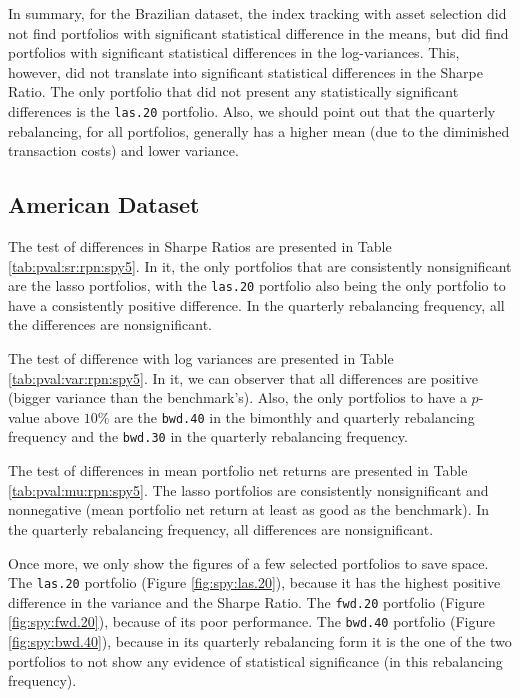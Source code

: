 \documentclass[12pt,oneside,a4paper]{memoir}
\begin{document}
In summary, for the Brazilian dataset, the index tracking with asset selection did not find portfolios with significant statistical difference in the means, but did find portfolios with significant statistical differences in the log-variances.
This, however, did not translate into significant statistical differences in the Sharpe Ratio.
The only portfolio that did not present any statistically significant differences is the \texttt{las.20} portfolio.
Also, we should point out that the quarterly rebalancing, for all portfolios, generally has a higher mean (due to the diminished transaction costs) and lower variance. 

\subsection{American Dataset} 

The test of differences in Sharpe Ratios are presented in Table \ref{tab:pval:sr:rpn:spy5}.
In it, the only portfolios that are consistently nonsignificant are the lasso portfolios, with the \texttt{las.20} portfolio also being the only portfolio to have a consistently positive difference.
In the quarterly rebalancing frequency, all the differences are nonsignificant.

The test of difference with log variances are presented in Table \ref{tab:pval:var:rpn:spy5}.
In it, we can observer that all differences are positive (bigger variance than the benchmark's).
Also, the only portfolios to have a $p$-value above $10\%$ are the \texttt{bwd.40} in the bimonthly and quarterly rebalancing frequency and the \texttt{bwd.30} in the quarterly rebalancing frequency.

The test of differences in mean portfolio net returns are presented in Table \ref{tab:pval:mu:rpn:spy5}.
The lasso portfolios are consistently nonsignificant and nonnegative (mean portfolio net return at least as good as the benchmark).
In the quarterly rebalancing frequency, all differences are nonsignificant.

Once more, we only show the figures of a few selected portfolios to save space.
The \texttt{las.20} portfolio (Figure \ref{fig:spy:las.20}), because it has the highest positive difference in the variance and the Sharpe Ratio.
The \texttt{fwd.20} portfolio (Figure \ref{fig:spy:fwd.20}), because of its poor performance.
The \texttt{bwd.40} portfolio (Figure \ref{fig:spy:bwd.40}), because in its quarterly rebalancing form it is the one of the two portfolios to not show any evidence of statistical significance (in this rebalancing frequency).
\end{document}
